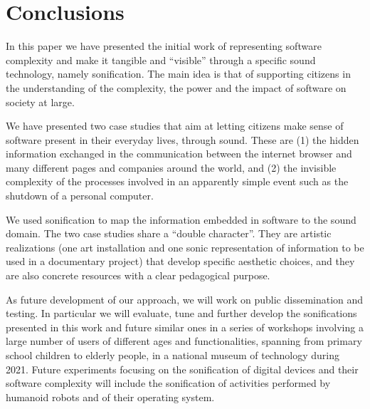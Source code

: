 \documentclass[manuscript,screen]{acmart}
\begin{document}
\section{Conclusions}
In this paper we have presented the initial work of representing software complexity and make it tangible and ``visible'' through a specific sound technology, namely sonification. The main idea is that of supporting citizens in the understanding of the complexity, the power and the impact of software on society at large.

We have presented two case studies that aim at letting citizens make sense of software present in their everyday lives, through sound. These are (1) the hidden information exchanged in the communication between the internet browser and many different pages and companies around the world, and (2) the invisible complexity of the processes involved in an apparently simple event such as the shutdown of a personal computer. 

We used sonification to map the information embedded in software to the sound domain. The two case studies share a ``double character''. They are artistic realizations (one art installation and one sonic representation of information to be used in a documentary project) that develop specific aesthetic choices, and they are also concrete resources with a clear pedagogical purpose.

As future development of our approach, we will work on public dissemination and testing. In particular we will evaluate, tune and further develop the sonifications presented in this work and future similar ones in a series of workshops involving a large number of users of different ages and functionalities, spanning from primary school children to elderly people, in a national museum of technology during 2021. Future experiments focusing on the sonification of digital devices and their software complexity will include the sonification of activities performed by humanoid robots and of their operating system.








  
\end{document}
